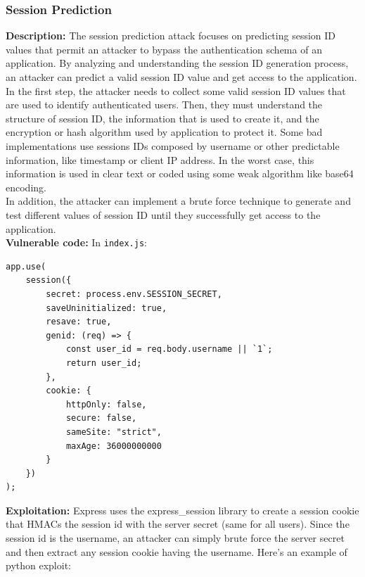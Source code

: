\documentclass[]{article}
\begin{document}
\subsubsection{Session Prediction}

\textbf{Description:} The session prediction attack focuses on predicting session ID values that permit an attacker to bypass the authentication schema of an application. By analyzing and understanding the session ID generation process, an attacker can predict a valid session ID value and get access to the application. \\ 
In the first step, the attacker needs to collect some valid session ID values that are used to identify authenticated users. Then, they must understand the structure of session ID, the information that is used to create it, and the encryption or hash algorithm used by application to protect it. Some bad implementations use sessions IDs composed by username or other predictable information, like timestamp or client IP address. In the worst case, this information is used in clear text or coded using some weak algorithm like base64 encoding. \\ 
In addition, the attacker can implement a brute force technique to generate and test different values of session ID until they successfully get access to the application.
\\ \textbf{Vulnerable code:} In \texttt{index.js}:
\begin{lstlisting}
app.use(
    session({
        secret: process.env.SESSION_SECRET,
        saveUninitialized: true,
        resave: true,
        genid: (req) => {
            const user_id = req.body.username || `1`;
            return user_id;
        },
        cookie: {
            httpOnly: false,
            secure: false,
            sameSite: "strict",
            maxAge: 36000000000
        }
    })
);
\end{lstlisting} 
\textbf{Exploitation:} Express uses the express\_session library to create a session cookie that HMACs the session id with the server secret (same for all users). Since the session id is the username, an attacker can simply brute force the server secret and then extract any session cookie having the username.
Here's an example of python exploit:
\end{document}
